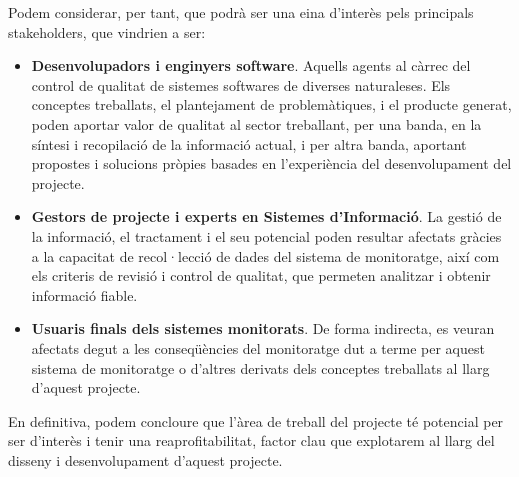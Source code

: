 Podem considerar, per tant, que podrà ser una eina d’interès pels principals stakeholders, que vindrien a ser:
\begin{itemize}
\item \textbf{Desenvolupadors i enginyers software}. Aquells agents al càrrec del control de qualitat de sistemes softwares de diverses naturaleses. Els conceptes treballats, el plantejament de problemàtiques, i el producte generat, poden aportar valor de qualitat al sector treballant, per una banda, en la síntesi i recopilació de la informació actual, i per altra banda, aportant propostes i solucions pròpies basades en l’experiència del desenvolupament del projecte.
\item \textbf{Gestors de projecte i experts en Sistemes d'Informació}. La gestió de la informació, el tractament i el seu potencial poden resultar afectats gràcies a la capacitat de recol·lecció de dades del sistema de monitoratge, així com els criteris de revisió i control de qualitat, que permeten analitzar i obtenir informació fiable.
\item \textbf{Usuaris finals dels sistemes monitorats}. De forma indirecta, es veuran afectats degut a les conseqüències del monitoratge dut a terme per aquest sistema de monitoratge o d’altres derivats dels conceptes treballats al llarg d’aquest projecte.
\end{itemize}

En definitiva, podem concloure que l'àrea de treball del projecte té potencial per ser d'interès i tenir una reaprofitabilitat, factor clau que explotarem al llarg del disseny i desenvolupament d'aquest projecte. 